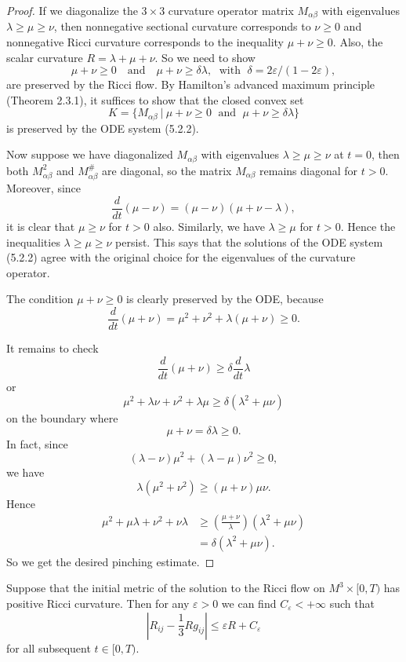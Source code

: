 \begin{proof}
If we diagonalize the $3\times 3$ curvature operator matrix
$M_{\alpha\beta}$ with eigenvalues $\lambda \ge \mu \ge \nu$, then
nonnegative sectional curvature corresponds to $\nu\geq0$ and
nonnegative Ricci curvature corresponds to the inequality
$\mu+\nu\geq0$. Also, the scalar curvature $R=\lambda+\mu+\nu$. So
we need to show
$$
\mu+\nu\geq 0 \quad \text{and} \quad \mu+\nu\geq\delta \lambda, \;
\text{ with }\; \delta=2\varepsilon/(1-2\varepsilon),
$$
are preserved by the Ricci flow. By Hamilton's advanced maximum
principle (Theorem 2.3.1), it suffices to show that the closed
convex set
$$
K=\{M_{\alpha\beta}\ |\ \mu+\nu\geq0\; \text{ and }\;
\mu+\nu\geq\delta\lambda\}
$$
is preserved by the ODE system (5.2.2).

Now suppose we have diagonalized $M_{\alpha\beta}$ with
eigenvalues $\lambda \ge \mu \ge \nu$ at $t=0$, then both
$M^2_{\alpha\beta}$ and $M_{\alpha\beta}^\#$ are diagonal, so the
matrix $M_{\alpha\beta}$ remains diagonal for $t>0$. Moreover,
since
$$
\frac{d}{dt}(\mu-\nu)=(\mu-\nu)(\mu+\nu-\lambda),
$$
it is clear that $\mu\geq \nu$ for $t>0$ also. Similarly, we have
$\lambda\geq\mu$ for $t>0$. Hence the inequalities $\lambda \ge
\mu \ge \nu$ persist. This says that the solutions of the ODE
system (5.2.2) agree with the original choice for the eigenvalues
of the curvature operator.

The condition $\mu+\nu\geq 0$ is clearly preserved by the ODE,
because
$$
\frac{d}{dt}(\mu+\nu)=\mu^2+\nu^2+\lambda(\mu+\nu)\geq 0.
$$

It remains to check
$$
\frac{d}{dt}(\mu+\nu)\geq\delta\frac{d}{dt}\lambda
$$
or
$$
\mu^2+\lambda\nu+\nu^2+\lambda\mu\geq\delta(\lambda^2+\mu\nu)
$$
on the boundary where
$$
\mu+\nu=\delta \lambda\geq0.
$$
In fact, since
$$
(\lambda-\nu)\mu^2+(\lambda-\mu)\nu^2\geq0,
$$
we have
$$
\lambda(\mu^2+\nu^2)\geq(\mu+\nu)\mu\nu.
$$
Hence
\begin{displaymath}
\begin{split}
    \mu^2+\mu\lambda+\nu^2+\nu\lambda
    &  \geq\left(\frac{\mu+\nu}{\lambda}\right)(\lambda^2+\mu\nu)\\[3mm]
    &  =\delta(\lambda^2+\mu\nu).
\end{split}
\end{displaymath}
So we get the desired pinching estimate.
\end{proof}

\begin{proposition} 
  \label{prop:cz-three-dimensional-positive-ricci-asymptotic-roundness}

Suppose that the initial metric of the solution to the Ricci flow
on $M^3\times [0,T)$ has positive Ricci curvature. Then for any
$\varepsilon>0$ we can find $C_\varepsilon<+\infty$ such that
$$
\left|R_{ij}-\frac{1}{3}Rg_{ij}\right|\leq\varepsilon
R+C_\varepsilon
$$
for all subsequent $t\in [0, T)$.
\end{proposition}

